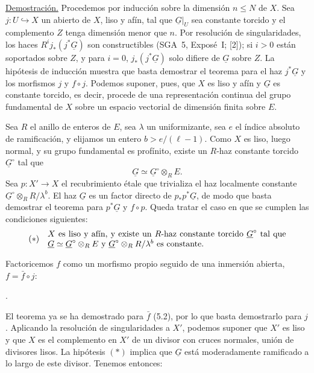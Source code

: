 \noindent\underline{Demostración.}
Procedemos por inducción sobre la dimensión $n\leq N$ de $X$. Sea
$j:U\hookrightarrow X$ un abierto de $X$, liso y afín, tal que
$\underline G|_U$ sea constante torcido y el complemento $Z$ tenga
dimensión menor que $n$. Por resolución de singularidades, los haces
$R^ij_*(j^*\underline G)$ son constructibles (SGA~5, Exposé~I; [2]); si
$i>0$ están soportados sobre $Z$, y para $i=0$,
$j_*(j^*\underline G)$ solo difiere de $\underline G$ sobre $Z$. La
hipótesis de inducción muestra que basta demostrar el teorema para el haz
$j^*\underline G$ y los morfismos $j$ y $f\circ j$. Podemos suponer,
pues, que $X$ es liso y afín y $\underline G$ es constante torcido, es
decir, procede de una representación continua del grupo fundamental de
$X$ sobre un espacio vectorial de dimensión finita sobre $E$.

\pageoriginale

Sea $R$ el anillo de enteros de $E$, sea $\lambda$ un uniformizante, sea
$e$ el índice absoluto de ramificación, y elijamos un entero
$b>e/(\ell-1)$. Como $X$ es liso, luego normal, y su grupo fundamental es
profínito, existe un $R$-haz constante torcido $\underline G^\circ$ tal
que
\[
\underline G\simeq\underline G^\circ\otimes_R E.
\]
Sea $p:X'\longrightarrow X$ el recubrimiento étale que trivializa el haz
localmente constante $\underline G^\circ\otimes_RR/\lambda^b$. El haz
$\underline G$ es un factor directo de $p_*p^*\underline G$, de modo que
basta demostrar el teorema para $p^*\underline G$ y $f\circ p$. Queda
tratar el caso en que se cumplen las condiciones siguientes:
\[
(*)\quad
\begin{minipage}{0.82\linewidth}
$X$ es liso y afín, y existe un $R$-haz constante torcido
$\underline G^\circ$ tal que
$\underline G\simeq\underline G^\circ\otimes_R E$ y
$\underline G^\circ\otimes_RR/\lambda^b$ es constante.
\end{minipage}
\]

Factoricemos $f$ como un morfismo propio seguido de una inmersión abierta,
$f=\bar f\circ j$:
\begin{center}
\qquad .
\end{center}
El teorema ya se ha demostrado para $\bar f$ (5.2), por lo que basta
demostrarlo para $j$. Aplicando la resolución de singularidades a $X'$,
podemos suponer que $X'$ es liso y que $X$ es el complemento en $X'$ de
un divisor con cruces normales, unión de divisores lisos. La hipótesis
$(*)$ implica que $\underline G$ está moderadamente ramificado a lo largo
de este divisor. Tenemos entonces:

